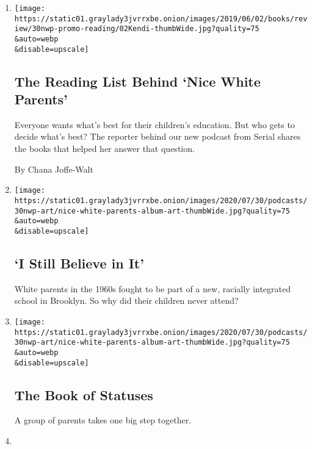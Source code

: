 \begin{enumerate}
\def\labelenumi{\arabic{enumi}.}
\item
  \href{/2020/07/30/podcasts/nice-white-parents-reading-list.html}{}

  \texttt{[image: https://static01.graylady3jvrrxbe.onion/images/2019/06/02/books/review/30nwp-promo-reading/02Kendi-thumbWide.jpg?quality=75\\\&auto=webp\\\&disable=upscale]}

  \hypertarget{the-reading-list-behind-nice-white-parents}{%
  \subsection{The Reading List Behind `Nice White
  Parents'}\label{the-reading-list-behind-nice-white-parents}}

  Everyone wants what's best for their children's education. But who
  gets to decide what's best? The reporter behind our new podcast from
  Serial shares the books that helped her answer that question.

  By Chana Joffe-Walt
\item
  \href{/2020/07/30/podcasts/nice-white-parents-serial-2.html}{}

  \texttt{[image: https://static01.graylady3jvrrxbe.onion/images/2020/07/30/podcasts/30nwp-art/nice-white-parents-album-art-thumbWide.jpg?quality=75\\\&auto=webp\\\&disable=upscale]}

  \hypertarget{i-still-believe-in-it}{%
  \subsection{`I Still Believe in It'}\label{i-still-believe-in-it}}

  White parents in the 1960s fought to be part of a new, racially
  integrated school in Brooklyn. So why did their children never attend?
\item
  \href{/2020/07/30/podcasts/nice-white-parents-serial.html}{}

  \texttt{[image: https://static01.graylady3jvrrxbe.onion/images/2020/07/30/podcasts/30nwp-art/nice-white-parents-album-art-thumbWide.jpg?quality=75\\\&auto=webp\\\&disable=upscale]}

  \hypertarget{the-book-of-statuses}{%
  \subsection{The Book of Statuses}\label{the-book-of-statuses}}

  A group of parents takes one big step together.
\item
  \href{/2020/07/27/podcasts/the-daily/new-york-hospitals-covid.html}{}


\end{enumerate}
